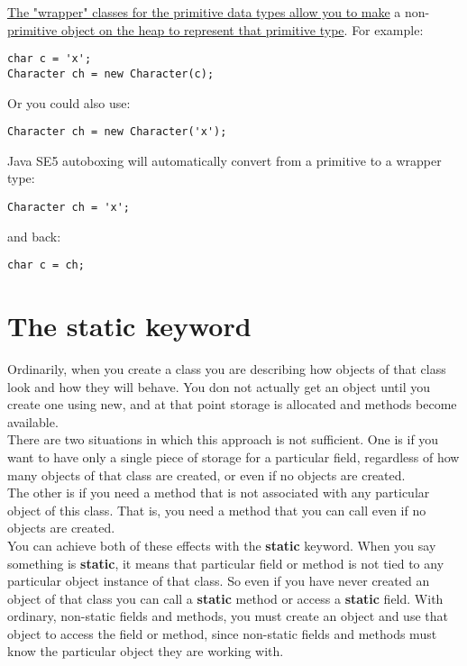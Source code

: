 \documentclass[10pt,letterpaper]{report}
\begin{document}
\underline{The "wrapper" classes for the primitive data types allow you to make} a non-\underline{primitive object on the heap to represent that primitive type}. For example:

\begin{lstlisting}
char c = 'x';
Character ch = new Character(c);
\end{lstlisting}

Or you could also use:
\begin{lstlisting}
Character ch = new Character('x');
\end{lstlisting}
Java SE5 autoboxing will automatically convert from a primitive to a wrapper type:
\begin{lstlisting}
Character ch = 'x';
\end{lstlisting}
and back:
\begin{lstlisting}
char c = ch;
\end{lstlisting}

\section{The \textbf{static} keyword}

Ordinarily, when you create a class you are describing how objects of that class look and how they will behave. You don not actually get an object until you create one using new, and at that point storage is allocated and methods become available.\\
There are two situations in which this approach is not sufficient. One is if you want to have only a single piece of storage for a particular field, regardless of how many objects of that class are created, or even if no objects are created.\\
The other is if you need a method that is not associated with any particular object of this class. That is, you need a method that you can call even if no objects are created.\\

You can achieve both of these effects with the \textbf{static} keyword. When you say something is \textbf{static}, it means that particular field or method is not tied to any particular object instance of that class. So even if you have never created an object of that class you can call a \textbf{static} method or access a \textbf{static} field. With ordinary, non-static fields and methods, you must create an object and use that object to access the field or method, since non-static fields and methods must know the particular object they are working with.
\\
\end{document}
